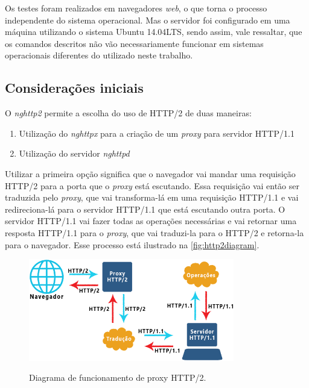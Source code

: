 Os testes foram realizados em navegadores \textit{web}, o que torna o processo independente do sistema operacional. Mas o servidor foi configurado em uma máquina utilizando o sistema Ubuntu 14.04LTS, sendo assim, vale ressaltar, que os comandos descritos não vão necessariamente funcionar em sistemas operacionais diferentes do utilizado neste trabalho.

\subsection{Considerações iniciais}
\label{consideracoesiniciais}

O \textit{nghttp2} permite a escolha do uso de HTTP/2 de duas maneiras:
\begin{enumerate}
	\item Utilização do \textit{nghttpx} para a criação de um \textit{proxy} para servidor HTTP/1.1
	\item Utilização do servidor \textit{nghttpd}
\end{enumerate}

Utilizar a primeira opção significa que o navegador vai mandar uma requisição HTTP/2 para a porta que o \textit{proxy} está escutando. Essa requisição vai então ser traduzida pelo \textit{proxy}, que vai transforma-lá em uma requisição HTTP/1.1 e vai redireciona-lá para o servidor HTTP/1.1 que está escutando outra porta. O servidor HTTP/1.1 vai fazer todas as operações necessárias e vai retornar uma resposta HTTP/1.1 para o \textit{proxy}, que vai traduzi-la para o HTTP/2 e retorna-la para o navegador. Esse processo está ilustrado na \autoref{fig:http2diagram}.

\begin{figure}[!htb]
    \centering
    \caption{Diagrama de funcionamento de proxy HTTP/2.}
    \includegraphics[width=0.8\textwidth]{./04-figuras/desenvolvimento/http2_proxy_diagram}
    \label{fig:http2diagram}
\end{figure}

